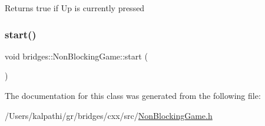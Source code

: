 \begin{DoxyReturn}{Returns}
true if Up is currently pressed 
\end{DoxyReturn}
\mbox{\label{classbridges_1_1_non_blocking_game_acb77c3a60ec27e422e9da8f479214b55}} 
\subsubsection{\texorpdfstring{start()}{start()}}
{\footnotesize\ttfamily void bridges\+::\+Non\+Blocking\+Game\+::start (\begin{DoxyParamCaption}{ }\end{DoxyParamCaption})\hspace{0.3cm}{\ttfamily [inline]}}



The documentation for this class was generated from the following file\+:\begin{DoxyCompactItemize}
\item 
/\+Users/kalpathi/gr/bridges/cxx/src/\mbox{\hyperlink{_non_blocking_game_8h}{Non\+Blocking\+Game.\+h}}\end{DoxyCompactItemize}

